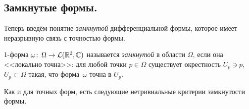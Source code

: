 \documentclass[../complex-analysis.tex]{subfiles}
\begin{document}
\subsection{Замкнутые формы.}

Теперь введём понятие \textit{замкнутой} дифференциальной формы, которое имеет неразрывную связь с точностью формы.

\begin{df}
 $1$-форма $\omega \colon\,\Omega\to\mathcal{L}(\mathbb{R}^2, \mathbb{C})$ называется \textit{замкнутой} в области $\Omega$, если она <<локально точна>>: для любой точки $p \in \Omega$ существует окрестность $U_p \ni p$, $U_p \subset \Omega$ такая, что форма~$\omega$ точна в $U_p$.
\end{df}

Как и для точных форм, есть следующие нетривиальные критерии замкнутости формы.
\end{document}
